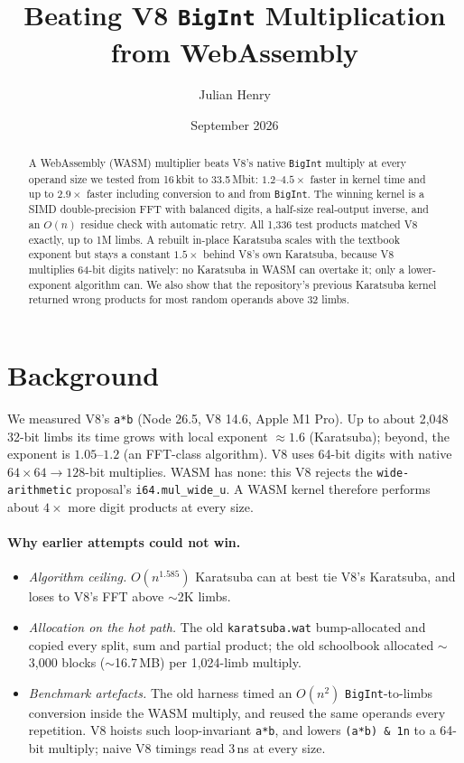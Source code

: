 \documentclass[10pt,twocolumn]{article}
\title{Beating V8 \texttt{BigInt} Multiplication from WebAssembly}
\author{Julian Henry}
\date{September 2026}
\begin{document}
\maketitle

\begin{abstract}
A WebAssembly (WASM) multiplier beats V8's native \texttt{BigInt} multiply at every
operand size we tested from 16\,kbit to 33.5\,Mbit: $1.2$--$4.5\times$ faster in kernel
time and up to $2.9\times$ faster including conversion to and from \texttt{BigInt}.
The winning kernel is a SIMD double-precision FFT with balanced digits, a half-size
real-output inverse, and an $O(n)$ residue check with automatic retry. All 1,336 test
products matched V8 exactly, up to 1M limbs. A rebuilt in-place Karatsuba scales with
the textbook exponent but stays a constant $1.5\times$ behind V8's own Karatsuba,
because V8 multiplies 64-bit digits natively: no Karatsuba in WASM can overtake it; only
a lower-exponent algorithm can. We also show that the repository's previous Karatsuba
kernel returned wrong products for most random operands above 32 limbs.
\end{abstract}

\section{Background}
We measured V8's \texttt{a*b} (Node 26.5, V8 14.6, Apple M1 Pro). Up to about 2,048
32-bit limbs its time grows with local exponent $\approx 1.6$ (Karatsuba); beyond, the
exponent is $1.05$--$1.2$ (an FFT-class algorithm). V8 uses 64-bit digits with native
$64\times64\to128$-bit multiplies. WASM has none: this V8 rejects the
\texttt{wide-arithmetic} proposal's \texttt{i64.mul\_wide\_u}. A WASM kernel therefore
performs about $4\times$ more digit products at every size.

\paragraph{Why earlier attempts could not win.}
\begin{itemize}
\item \emph{Algorithm ceiling.} $O(n^{1.585})$ Karatsuba can at best tie V8's Karatsuba,
  and loses to V8's FFT above $\sim$2K limbs.
\item \emph{Allocation on the hot path.} The old \texttt{karatsuba.wat} bump-allocated and
  copied every split, sum and partial product; the old schoolbook allocated $\sim$3,000
  blocks ($\sim$16.7\,MB) per 1,024-limb multiply.
\item \emph{Benchmark artefacts.} The old harness timed an $O(n^2)$ \texttt{BigInt}-to-limbs
  conversion inside the WASM multiply, and reused the same operands every repetition.
  V8 hoists such loop-invariant \texttt{a*b}, and lowers \texttt{(a*b) \& 1n} to a 64-bit
  multiply; naive V8 timings read 3\,ns at every size.
\end{itemize}
\end{document}
